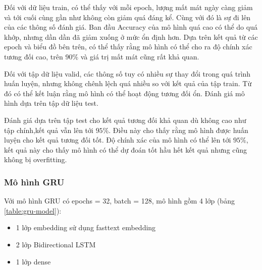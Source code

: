 Đối với dữ liệu train, có thể thấy với mỗi epoch, lượng mất mát ngày càng giảm và tới cuối cùng gần như không còn giảm quá đáng kể. Cùng với đó là sự đi lên của các thông số đánh giá. Ban đầu Accuracy của mô hình quá cao có thể do quá khớp, nhưng dần dần đã giảm xuống ở mức ổn định hơn. Dựa trên kết quả từ các epoch và biểu đồ bên trên, có thể thấy rằng mô hình có thể cho ra độ chính xác tương đối cao, trên $90\%$ và giá trị mất mát cũng rất khả quan.

Đối với tập dữ liệu valid, các thông số tuy có nhiều sự thay đổi trong quá trình huấn
luyện, nhưng không chênh lệch quá nhiều so với kết quả của tập train. Từ đó có thể kết
luận rằng mô hình có thể hoạt động tương đối ổn.
Đánh giá mô hình dựa trên tập dữ liệu test.

Đánh giá dựa trên tập test cho kết quả tương đối khả quan dù không cao như tập chính,kết quả vẫn lên tới $95\%$. Điều này cho thấy rằng mô hình được huấn luyện cho kết quả tương đối tốt. Độ chính xác của mô hình có thể lên tới $95\%$, kết quả này cho thấy mô hình có thể dự đoán tốt hầu hết kết quả nhưng cũng không bị overfitting.


\subsubsection{Mô hình GRU}
Với mô hình GRU có epochs = 32, batch = 128, mô hình gồm 4 lớp (bảng \ref{table:gru-model}):
\begin{itemize}
    \item 1 lớp embedding sử dụng fasttext embedding
    \item 2 lớp Bidirectional LSTM
    \item 1 lớp dense
\end{itemize}

